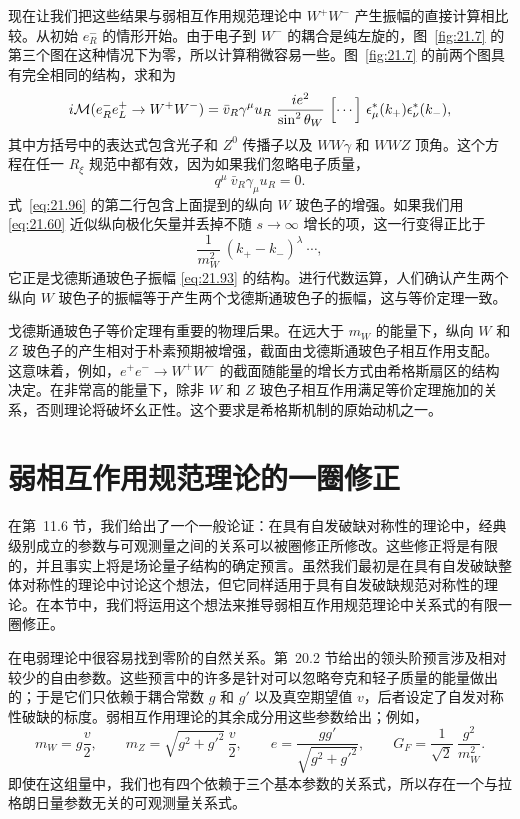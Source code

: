 现在让我们把这些结果与弱相互作用规范理论中 $W^{+}W^{-}$ 产生振幅的直接计算相比较。从初始 $e^-_R$ 的情形开始。由于电子到 $W^-$ 的耦合是纯左旋的，图~\ref{fig:21.7} 的第三个图在这种情况下为零，所以计算稍微容易一些。图~\ref{fig:21.7} 的前两个图具有完全相同的结构，求和为
\begin{equation}
  i\mathcal{M}(e^-_Re^+_L \to W^+W^-) = \bar{v}_R\gamma^\mu u_R\ \frac{
    ie^2}{\sin^2\theta_W}\ \Bigl[ \cdots \Bigr]\
    \epsilon^{*}_\mu(k_+)\epsilon^{*}_\nu(k_-) ,
  \label{eq:21.96}
\end{equation}
其中方括号中的表达式包含光子和 $Z^0$ 传播子以及 $WW\gamma$ 和 $WWZ$ 顶角。这个方程在任一 $R_\xi$ 规范中都有效，因为如果我们忽略电子质量，
\begin{equation}
  q^\mu\ \bar{v}_R\gamma_\mu u_R = 0 .
  \label{eq:21.97}
\end{equation}
式~\eqref{eq:21.96} 的第二行包含上面提到的纵向 $W$ 玻色子的增强。如果我们用 \eqref{eq:21.60} 近似纵向极化矢量并丢掉不随 $s\to\infty$ 增长的项，这一行变得正比于
\begin{equation}
  \frac{1}{m_W^2}\ (k_+ - k_-)^\lambda\ \cdots ,
  \label{eq:21.98}
\end{equation}
它正是戈德斯通玻色子振幅 \eqref{eq:21.93} 的结构。进行代数运算，人们确认产生两个纵向 $W$ 玻色子的振幅等于产生两个戈德斯通玻色子的振幅，这与等价定理一致。

戈德斯通玻色子等价定理有重要的物理后果。在远大于 $m_W$ 的能量下，纵向 $W$ 和 $Z$ 玻色子的产生相对于朴素预期被增强，截面由戈德斯通玻色子相互作用支配。这意味着，例如，$e^{+}e^{-}\to W^{+}W^{-}$ 的截面随能量的增长方式由希格斯扇区的结构决定。在非常高的能量下，除非 $W$ 和 $Z$ 玻色子相互作用满足等价定理施加的关系，否则理论将破坏幺正性。这个要求是希格斯机制的原始动机之一。

\section{弱相互作用规范理论的一圈修正}

在第~11.6 节，我们给出了一个一般论证：在具有自发破缺对称性的理论中，经典级别成立的参数与可观测量之间的关系可以被圈修正所修改。这些修正将是有限的，并且事实上将是场论量子结构的确定预言。虽然我们最初是在具有自发破缺整体对称性的理论中讨论这个想法，但它同样适用于具有自发破缺规范对称性的理论。在本节中，我们将运用这个想法来推导弱相互作用规范理论中关系式的有限一圈修正。

在电弱理论中很容易找到零阶的自然关系。第~20.2 节给出的领头阶预言涉及相对较少的自由参数。这些预言中的许多是针对可以忽略夸克和轻子质量的能量做出的；于是它们只依赖于耦合常数 $g$ 和 $g'$ 以及真空期望值 $v$，后者设定了自发对称性破缺的标度。弱相互作用理论的其余成分用这些参数给出；例如，
\begin{equation}
  m_W = g\frac{v}{2},\qquad
  m_Z = \sqrt{g^2 + g'^2}\,\frac{v}{2},\qquad
  e = \frac{gg'}{\sqrt{g^2+g'^2}},\qquad
  G_F = \frac{1}{\sqrt{2}}\ \frac{g^2}{m_W^2} .
  \label{eq:21.109}
\end{equation}
即使在这组量中，我们也有四个依赖于三个基本参数的关系式，所以存在一个与拉格朗日量参数无关的可观测量关系式。

